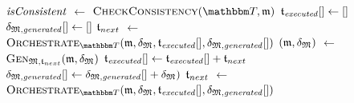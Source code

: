 \newcommand{\applyalgexecuted}{\sequence{\transformation{t}_{\mathvariable{executed}}}}
\newcommand{\applyalggenerated}{\sequence{\changetuple{\metamodeltuple{M}, \mathvariable{generated}}}}
\begin{algorithm}
    \begin{algorithmic}[1]
            \State $\mathit{isConsistent}$ $\leftarrow$ $\function{CheckConsistency}(\transformationset{T}, \modeltuple{m})$
                \State \Return{$\bot$}
            \EndIf
            \State $\applyalgexecuted \leftarrow \sequenced{}$
            \State $\applyalggenerated \leftarrow \sequenced{}$
            \State $\mathfrak{t}_{next}$ $\leftarrow$ $\function{Orchestrate}_{\transformationset{T}}(\modeltuple{m}, \changetuple{\metamodeltuple{M}}, \applyalgexecuted, \applyalggenerated)$ \label{algo:orchestration:application:line:startorchestrate}
                \State $(\mathfrak{m}, \mathfrak{\delta}_{\mathfrak{M}})$ $\leftarrow$ $\textsc{Gen}_{\mathfrak{M}, \mathfrak{t}_{next}}(\mathfrak{m}, \mathfrak{\delta}_{\mathfrak{M}})$ \label{algo:orchestration:application:line:stepcalculation}
                \State $\applyalgexecuted \gets \applyalgexecuted + \transformation{t}_{next}$
                \State $\applyalggenerated \gets \applyalggenerated + \changetuple{\metamodeltuple{M}})$
                \State $\mathfrak{t}_{next}$ $\leftarrow$ $\function{Orchestrate}_{\transformationset{T}}(\modeltuple{m}, \changetuple{\metamodeltuple{M}}, \applyalgexecuted, \applyalggenerated)$
            \EndWhile \label{algo:orchestration:application:line:endorchestrate}

\end{algorithmic}
\end{algorithm}
